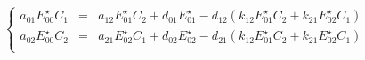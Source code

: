 \documentclass[aps,onecolumn,12pt]{revtex4}
\begin{document}
\begin{equation}
\left\lbrace
\begin{array}{rcl}
a_{01} E_{00}^\star C_1 & = & a_{12} E_{01}^\star C_2  + d_{01}E_{01}^\star - d_{12}\left( k_{12} E_{01}^\star C_2 + k_{21} E_{02}^\star C_1 \right)\\
a_{02} E_{00}^\star C_2 & = & a_{21}E_{02}^\star C_1 + d_{02}E_{02}^\star - d_{21} \left( k_{12} E_{01}^\star C_2 + k_{21} E_{02}^\star C_1 \right)\\ 
\end{array}
\right.
\end{equation}
\end{document}
